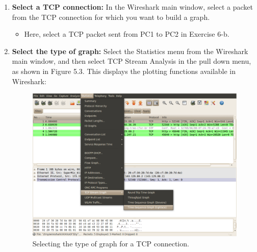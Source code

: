 \begin{enumerate}
	\item \textbf{Select a TCP connection:} In the Wireshark main window, select a packet from the TCP connection for which you want to build a graph.
		\begin{itemize}
			\item Here, select a TCP packet sent from PC1 to PC2 in Exercise 6-b.
		\end{itemize}
	\item \textbf{Select the type of graph:} Select the Statistics menu from the Wireshark main window, and then select TCP Stream Analysis in the pull down menu, as shown in Figure 5.3. This displays the plotting functions available in Wireshark:
		\begin{figure}[ht]
			\centering
			\includegraphics[width=\linewidth]{graphics/fig-5-3-updated.png}	
			\caption{Selecting the type of graph for a TCP connection.}
			\label{fig:lab5-type-of-tcp-graph}
		\end{figure}
		\begin{figure}[ht]
			\centering

\end{figure}
\end{enumerate}
